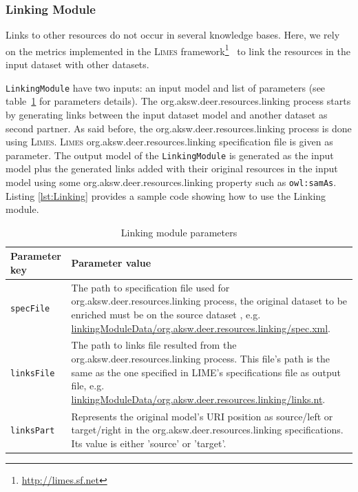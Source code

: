 \documentclass[a4paper,twoside,bibtotoc,abstracton,12pt,BCOR=15mm]{article}
\newcommand{\limes}{\textsc{Limes}\xspace}
\begin{document}
    \subsubsection{Linking Module}
    Links to other resources do not occur in several knowledge bases.
    Here, we rely on the metrics implemented in the \limes framework\footnote{\url{http://limes.sf.net}}~\cite{NGAU11,NGON12c,NGO+13c} to link the resources in the input dataset with other datasets.
  
    \texttt{LinkingModule} have two inputs: an input model and list of parameters (see table~\ref{tbl:linkingPram} for parameters details).
    The org.aksw.deer.resources.linking process starts by generating links between the input dataset model and another dataset as second partner.
    As said before, the org.aksw.deer.resources.linking process is done using \limes.
    \limes org.aksw.deer.resources.linking specification file is given as parameter.
    The output model of the \texttt{LinkingModule} is generated as the input model plus the generated links added with their original resources in the input model using    some org.aksw.deer.resources.linking property such as \texttt{owl:samAs}.
    Listing \ref{lst:Linking} provides a sample code showing how to use the Linking module.

    \begin{table}
    \caption{Linking module parameters} \label{tbl:linkingPram}
    \small
    \begin{tabularx}{\textwidth}{@{}lX@{}}
    \toprule
    \textbf{Parameter key} 	&  \textbf{Parameter value}\\
    \toprule
    \texttt{specFile}	& The path to specification file used for org.aksw.deer.resources.linking process, the original dataset to be enriched must be on the source dataset , e.g. \url {linkingModuleData/org.aksw.deer.resources.linking/spec.xml}.\\
    \midrule
    \texttt{linksFile}	& The path to links file resulted from the org.aksw.deer.resources.linking process. This file's path is the same as the one specified in LIME's specifications file as output file, e.g. \url {linkingModuleData/org.aksw.deer.resources.linking/links.nt}.\\
    \midrule
    \texttt{linksPart} 	& Represents the original model's URI position as source/left or target/right in the org.aksw.deer.resources.linking specifications. Its value is either 'source' or 'target'.\\
    \bottomrule
    \end{tabularx}
    \end{table}
\end{document}
